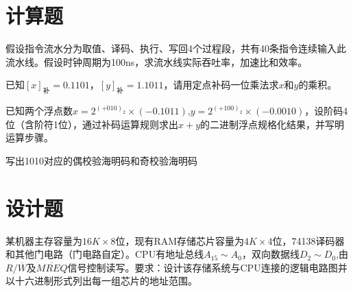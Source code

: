 \documentclass[a4paper]{exam}
\begin{document}
\section{计算题}
\begin{questions}
	\question 假设指令流水分为取值、译码、执行、写回4个过程段，共有40条指令连续输入此流水线。假设时钟周期为100ns，求流水线实际吞吐率，加速比和效率。
	\vspace{3cm}

	\question 已知${\left[ x \right]_{\mbox{补}}}=0.1101$，${\left[ y \right]_{\mbox{补}}} =1.1011$，请用定点补码一位乘法求$x$和$y$的乘积。

	\vspace{3cm}

	\question 已知两个浮点数$x = {2^{{{( + 010)}_2}}} \times ( - 0.1011)$,$y = {2^{{{( + 100)}_2}}} \times ( - 0.0010)$，设阶码4位（含阶符1位），通过补码运算规则求出$x+y$的二进制浮点规格化结果，并写明运算步骤。\
	\vspace{4cm}

	\question 写出1010对应的偶校验海明码和奇校验海明码

	\vspace{3cm}
\end{questions}

\section{设计题}
\begin{questions}
	\question 某机器主存容量为$16K \times 8$位，现有RAM存储芯片容量为$4K \times 4$位，74138译码器和其他门电路（门电路自定）。CPU有地址总线${A_{15}} \sim {A_0}$，双向数据线$D_2 \sim D_0$,由$R/\overline W$及$\overline {MREQ}$信号控制读写。要求：设计该存储系统与CPU连接的逻辑电路图并以十六进制形式列出每一组芯片的地址范围。
	\vspace{4cm}
\end{questions}
\end{document}
